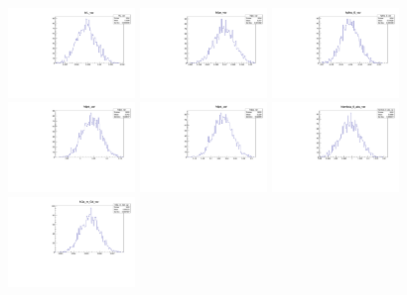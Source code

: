 \begin{figure}[tb]
   \begin{center}
	\includegraphics[width=0.3\textwidth]{figs/MCwBkgVars/fL_var.pdf}
	\includegraphics[width=0.3\textwidth]{figs/MCwBkgVars/fpe_var.pdf}
	\includegraphics[width=0.3\textwidth]{figs/MCwBkgVars/phis_0_var.pdf}
	\includegraphics[width=0.3\textwidth]{figs/MCwBkgVars/dpe_var.pdf}
	\includegraphics[width=0.3\textwidth]{figs/MCwBkgVars/dpa_var.pdf}
	\includegraphics[width=0.3\textwidth]{figs/MCwBkgVars/lambda_0_abs_var.pdf}
	\includegraphics[width=0.3\textwidth]{figs/MCwBkgVars/Gs_m_Gd_var.pdf}

\end{center}
\end{figure}
